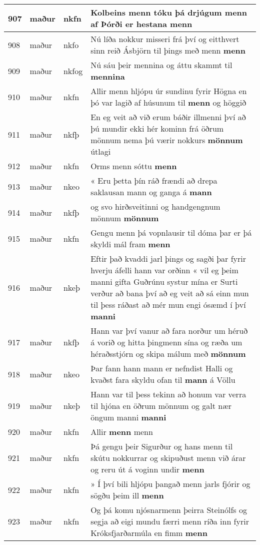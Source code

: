\documentclass{article}
\begin{document}
\begin{longtable}{p{1cm}|p{1cm}|p{1cm}|p{13cm}}
\hline
907&maður&nkfn&Kolbeins menn tóku þá drjúgum menn af Þórði er hestana \textbf{menn} \\
\hline
908&maður&nkfo&Nú líða nokkur misseri frá því og eitthvert sinn reið Ásbjörn til þings með menn \textbf{menn} \\
\hline
909&maður&nkfog&Nú sáu þeir mennina og áttu skammt til \textbf{mennina} \\
\hline
910&maður&nkfn&Allir menn hljópu úr sundinu fyrir Högna en þó var lagið af húsunum til \textbf{menn} og höggið\\
\hline
911&maður&nkfþ&En eg veit að við erum báðir illmenni því að þú mundir ekki hér kominn frá öðrum mönnum nema þú værir nokkurs \textbf{mönnum} útlagi\\
\hline
912&maður&nkfn&Orms menn sóttu \textbf{menn} \\
\hline
913&maður&nkeo&« Eru þetta þín ráð frændi að drepa saklausan mann og ganga á \textbf{mann} \\
\hline
914&maður&nkfþ&og svo hirðsveitinni og handgengnum mönnum \textbf{mönnum} \\
\hline
915&maður&nkfn&Gengu menn þá vopnlausir til dóma þar er þá skyldi mál fram \textbf{menn} \\
\hline
916&maður&nkeþ&Eftir það kvaddi jarl þings og sagði þar fyrir hverju áfelli hann var orðinn « vil eg þeim manni gifta Guðrúnu systur mína er Surti verður að bana því að eg veit að sá einn mun til þess ráðast að mér mun engi ósæmd í því \textbf{manni} \\
\hline
917&maður&nkfþ&Hann var því vanur að fara norður um héruð á vorið og hitta þingmenn sína og ræða um héraðsstjórn og skipa málum með \textbf{mönnum} \\
\hline
918&maður&nkeo&Þar fann hann mann er nefndist Halli og kvaðst fara skyldu ofan til \textbf{mann} á Völlu\\
\hline
919&maður&nkeþ&Hann var til þess tekinn að honum var verra til hjóna en öðrum mönnum og galt nær öngum manni \textbf{manni} \\
\hline
920&maður&nkfn&Allir \textbf{menn} menn\\
\hline
921&maður&nkfn&Þá gengu þeir Sigurður og hans menn til skútu nokkurrar og skipuðust menn við árar og reru út á voginn undir \textbf{menn} \\
\hline
922&maður&nkfn&» Í því bili hljópu þangað menn jarls fjórir og sögðu þeim ill \textbf{menn} \\
\hline
923&maður&nkfn&Og þá komu njósnarmenn þeirra Steinólfs og segja að eigi mundu færri menn ríða inn fyrir Króksfjarðarmúla en fimm \textbf{menn} \\

\end{longtable}
\end{document}
